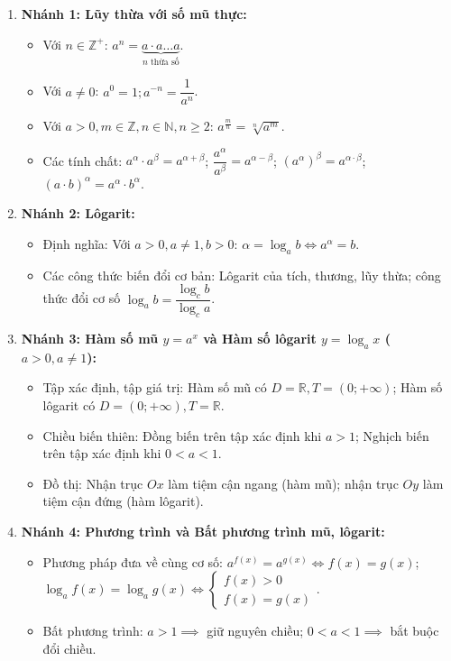 \documentclass[12pt, a4paper]{article}
\begin{document}
\begin{enumerate}[leftmargin=0.6cm]
    \item \textbf{Nhánh 1: Lũy thừa với số mũ thực:}
    \begin{itemize}
        \item Với $n \in \mathbb{Z}^+$: $a^n = \underbrace{a \cdot a \dots a}_{n\text{ thừa số}}$.
        \item Với $a \neq 0$: $a^0 = 1; a^{-n} = \dfrac{1}{a^n}$.
        \item Với $a > 0, m \in \mathbb{Z}, n \in \mathbb{N}, n \ge 2$: $a^{\frac{m}{n}} = \sqrt[n]{a^m}$.
        \item Các tính chất: $a^\alpha \cdot a^\beta = a^{\alpha + \beta}$; $\dfrac{a^\alpha}{a^\beta} = a^{\alpha - \beta}$; $(a^\alpha)^\beta = a^{\alpha \cdot \beta}$; $(a \cdot b)^\alpha = a^\alpha \cdot b^\alpha$.
    \end{itemize}
    \item \textbf{Nhánh 2: Lôgarit:}
    \begin{itemize}
        \item Định nghĩa: Với $a > 0, a \neq 1, b > 0$: $\alpha = \log_a b \iff a^\alpha = b$.
        \item Các công thức biến đổi cơ bản: Lôgarit của tích, thương, lũy thừa; công thức đổi cơ số $\log_a b = \dfrac{\log_c b}{\log_c a}$.
    \end{itemize}
    \item \textbf{Nhánh 3: Hàm số mũ $y = a^x$ và Hàm số lôgarit $y = \log_a x$ ($a > 0, a \neq 1$):}
    \begin{itemize}
        \item Tập xác định, tập giá trị: Hàm số mũ có $D = \mathbb{R}, T = (0; +\infty)$; Hàm số lôgarit có $D = (0; +\infty), T = \mathbb{R}$.
        \item Chiều biến thiên: Đồng biến trên tập xác định khi $a > 1$; Nghịch biến trên tập xác định khi $0 < a < 1$.
        \item Đồ thị: Nhận trục $Ox$ làm tiệm cận ngang (hàm mũ); nhận trục $Oy$ làm tiệm cận đứng (hàm lôgarit).
    \end{itemize}
    \item \textbf{Nhánh 4: Phương trình và Bất phương trình mũ, lôgarit:}
    \begin{itemize}
        \item Phương pháp đưa về cùng cơ số: $a^{f(x)} = a^{g(x)} \iff f(x) = g(x)$; $\log_a f(x) = \log_a g(x) \iff \begin{cases} f(x) > 0 \\ f(x) = g(x) \end{cases}$.
        \item Bất phương trình: $a > 1 \implies$ giữ nguyên chiều; $0 < a < 1 \implies$ bắt buộc đổi chiều.
    \end{itemize}
\end{enumerate}
\end{document}
